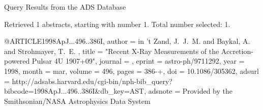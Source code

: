 Query Results from the ADS Database


Retrieved 1 abstracts, starting with number 1.  Total number selected: 1.

@ARTICLE{1998ApJ...496..386I,
   author = {{in 't Zand}, J.~J.~M. and {Baykal}, A. and {Strohmayer}, T.~E.
	},
    title = "{Recent X-Ray Measurements of the Accretion-powered Pulsar 4U 1907+09}",
  journal = {\apj},
   eprint = {astro-ph/9711292},
     year = 1998,
    month = mar,
   volume = 496,
    pages = {386-+},
      doi = {10.1086/305362},
   adsurl = {http://adsabs.harvard.edu/cgi-bin/nph-bib_query?bibcode=1998ApJ...496..386I&db_key=AST},
  adsnote = {Provided by the Smithsonian/NASA Astrophysics Data System}
}


